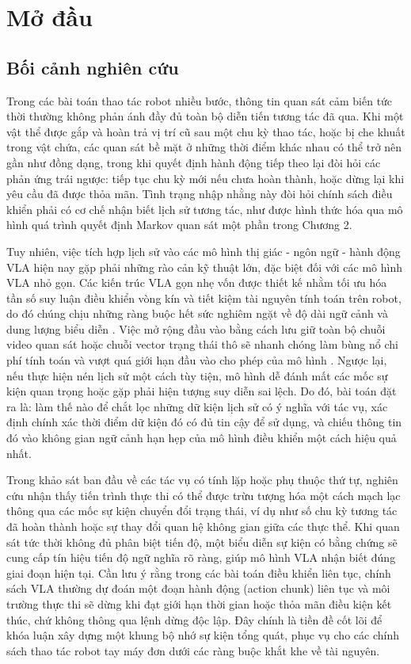 \chapter{Mở đầu}

\section{Bối cảnh nghiên cứu}

Trong các bài toán thao tác robot nhiều bước, thông tin quan sát cảm biến tức thời thường không phản ánh đầy đủ toàn bộ diễn tiến tương tác đã qua. Khi một vật thể được gắp và hoàn trả vị trí cũ sau một chu kỳ thao tác, hoặc bị che khuất trong vật chứa, các quan sát bề mặt ở những thời điểm khác nhau có thể trở nên gần như đồng dạng, trong khi quyết định hành động tiếp theo lại đòi hỏi các phản ứng trái ngược: tiếp tục chu kỳ mới nếu chưa hoàn thành, hoặc dừng lại khi yêu cầu đã được thỏa mãn. Tình trạng nhập nhằng này đòi hỏi chính sách điều khiển phải có cơ chế nhận biết lịch sử tương tác, như được hình thức hóa qua mô hình quá trình quyết định Markov quan sát một phần trong Chương 2.

Tuy nhiên, việc tích hợp lịch sử vào các mô hình thị giác - ngôn ngữ - hành động VLA hiện nay gặp phải những rào cản kỹ thuật lớn, đặc biệt đối với các mô hình VLA nhỏ gọn. Các kiến trúc VLA gọn nhẹ vốn được thiết kế nhằm tối ưu hóa tần số suy luận điều khiển vòng kín và tiết kiệm tài nguyên tính toán trên robot, do đó chúng chịu những ràng buộc hết sức nghiêm ngặt về độ dài ngữ cảnh và dung lượng biểu diễn \cite{smolvla2025}. Việc mở rộng đầu vào bằng cách lưu giữ toàn bộ chuỗi video quan sát hoặc chuỗi vector trạng thái thô sẽ nhanh chóng làm bùng nổ chi phí tính toán và vượt quá giới hạn đầu vào cho phép của mô hình \cite{mem2026}. Ngược lại, nếu thực hiện nén lịch sử một cách tùy tiện, mô hình dễ đánh mất các mốc sự kiện quan trọng hoặc gặp phải hiện tượng suy diễn sai lệch. Do đó, bài toán đặt ra là: làm thế nào để chắt lọc những dữ kiện lịch sử có ý nghĩa với tác vụ, xác định chính xác thời điểm dữ kiện đó có đủ tin cậy để sử dụng, và chiếu thông tin đó vào không gian ngữ cảnh hạn hẹp của mô hình điều khiển một cách hiệu quả nhất.

Trong khảo sát ban đầu về các tác vụ có tính lặp hoặc phụ thuộc thứ tự, nghiên cứu nhận thấy tiến trình thực thi có thể được trừu tượng hóa một cách mạch lạc thông qua các mốc sự kiện chuyển đổi trạng thái, ví dụ như số chu kỳ tương tác đã hoàn thành hoặc sự thay đổi quan hệ không gian giữa các thực thể. Khi quan sát tức thời không đủ phân biệt tiến độ, một biểu diễn sự kiện có bằng chứng sẽ cung cấp tín hiệu tiến độ ngữ nghĩa rõ ràng, giúp mô hình VLA nhận biết đúng giai đoạn hiện tại. Cần lưu ý rằng trong các bài toán điều khiển liên tục, chính sách VLA thường dự đoán một đoạn hành động (action chunk) liên tục và môi trường thực thi sẽ dừng khi đạt giới hạn thời gian hoặc thỏa mãn điều kiện kết thúc, chứ không thông qua lệnh dừng độc lập. Đây chính là tiền đề cốt lõi để khóa luận xây dựng một khung bộ nhớ sự kiện tổng quát, phục vụ cho các chính sách thao tác robot tay máy đơn dưới các ràng buộc khắt khe về tài nguyên.

